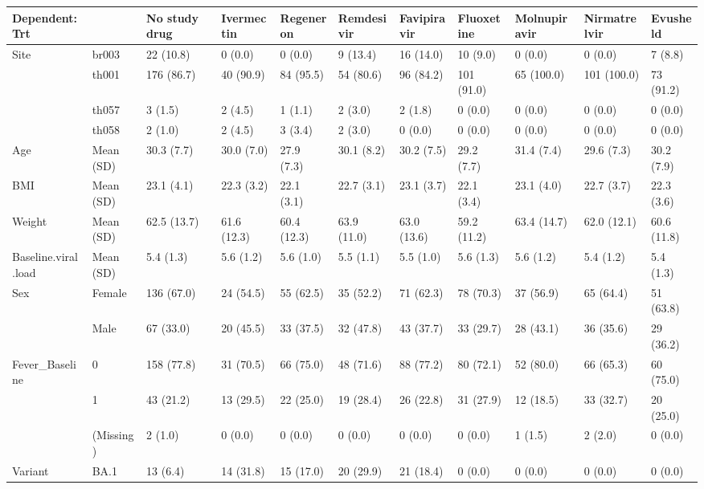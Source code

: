 
\begin{tabular}{l|l|l|l|l|l|l|l|l|l|l}
\hline
Dependent: Trt &   & No study drug & Ivermectin & Regeneron & Remdesivir & Favipiravir & Fluoxetine & Molnupiravir & Nirmatrelvir & Evusheld\\
\hline
Site & br003 & 22 (10.8) & 0 (0.0) & 0 (0.0) & 9 (13.4) & 16 (14.0) & 10 (9.0) & 0 (0.0) & 0 (0.0) & 7 (8.8)\\
\hline
 & th001 & 176 (86.7) & 40 (90.9) & 84 (95.5) & 54 (80.6) & 96 (84.2) & 101 (91.0) & 65 (100.0) & 101 (100.0) & 73 (91.2)\\
\hline
 & th057 & 3 (1.5) & 2 (4.5) & 1 (1.1) & 2 (3.0) & 2 (1.8) & 0 (0.0) & 0 (0.0) & 0 (0.0) & 0 (0.0)\\
\hline
 & th058 & 2 (1.0) & 2 (4.5) & 3 (3.4) & 2 (3.0) & 0 (0.0) & 0 (0.0) & 0 (0.0) & 0 (0.0) & 0 (0.0)\\
\hline
Age & Mean (SD) & 30.3 (7.7) & 30.0 (7.0) & 27.9 (7.3) & 30.1 (8.2) & 30.2 (7.5) & 29.2 (7.7) & 31.4 (7.4) & 29.6 (7.3) & 30.2 (7.9)\\
\hline
BMI & Mean (SD) & 23.1 (4.1) & 22.3 (3.2) & 22.1 (3.1) & 22.7 (3.1) & 23.1 (3.7) & 22.1 (3.4) & 23.1 (4.0) & 22.7 (3.7) & 22.3 (3.6)\\
\hline
Weight & Mean (SD) & 62.5 (13.7) & 61.6 (12.3) & 60.4 (12.3) & 63.9 (11.0) & 63.0 (13.6) & 59.2 (11.2) & 63.4 (14.7) & 62.0 (12.1) & 60.6 (11.8)\\
\hline
Baseline.viral.load & Mean (SD) & 5.4 (1.3) & 5.6 (1.2) & 5.6 (1.0) & 5.5 (1.1) & 5.5 (1.0) & 5.6 (1.3) & 5.6 (1.2) & 5.4 (1.2) & 5.4 (1.3)\\
\hline
Sex & Female & 136 (67.0) & 24 (54.5) & 55 (62.5) & 35 (52.2) & 71 (62.3) & 78 (70.3) & 37 (56.9) & 65 (64.4) & 51 (63.8)\\
\hline
 & Male & 67 (33.0) & 20 (45.5) & 33 (37.5) & 32 (47.8) & 43 (37.7) & 33 (29.7) & 28 (43.1) & 36 (35.6) & 29 (36.2)\\
\hline
Fever\_Baseline & 0 & 158 (77.8) & 31 (70.5) & 66 (75.0) & 48 (71.6) & 88 (77.2) & 80 (72.1) & 52 (80.0) & 66 (65.3) & 60 (75.0)\\
\hline
 & 1 & 43 (21.2) & 13 (29.5) & 22 (25.0) & 19 (28.4) & 26 (22.8) & 31 (27.9) & 12 (18.5) & 33 (32.7) & 20 (25.0)\\
\hline
 & (Missing) & 2 (1.0) & 0 (0.0) & 0 (0.0) & 0 (0.0) & 0 (0.0) & 0 (0.0) & 1 (1.5) & 2 (2.0) & 0 (0.0)\\
\hline
Variant & BA.1 & 13 (6.4) & 14 (31.8) & 15 (17.0) & 20 (29.9) & 21 (18.4) & 0 (0.0) & 0 (0.0) & 0 (0.0) & 0 (0.0)\\

\end{tabular}
